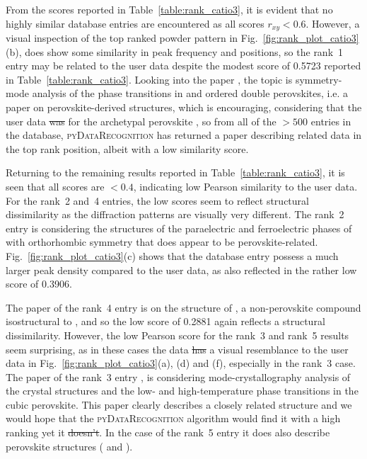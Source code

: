 \documentclass[preprint]{iucr}
\newcommand{\fig}[1]{Fig.~\ref{fig:#1}}
\newcommand{\tabl}[1]{Table~\ref{table:#1}}
\newcommand{\pydr}{\textsc{pyDataRecognition}\xspace}
\providecommand{\DIFadd}[1]{{\protect\color{blue}\uwave{#1}}} %
\providecommand{\DIFdel}[1]{{\protect\color{red}\sout{#1}}}                      %
\providecommand{\DIFaddbegin}{} %
\providecommand{\DIFaddend}{} %
\providecommand{\DIFdelbegin}{} %
\providecommand{\DIFdelend}{} %
\newcommand{\DIFscaledelfig}{0.5}
\newlength{\DIFdelgraphicswidth} %
\newlength{\DIFdelgraphicsheight} %
\newcommand{\DIFaddincludegraphics}[2][]{{\color{blue}\fbox{\DIFOincludegraphics[#1]{#2}}}} %
\newcommand{\DIFdelincludegraphics}[2][]{%
\sbox{\DIFdelgraphicsbox}{\DIFOincludegraphics[#1]{#2}}%
\settoboxwidth{\DIFdelgraphicswidth}{\DIFdelgraphicsbox} %
\settoboxtotalheight{\DIFdelgraphicsheight}{\DIFdelgraphicsbox} %
\scalebox{\DIFscaledelfig}{%
\parbox[b]{\DIFdelgraphicswidth}{\usebox{\DIFdelgraphicsbox}\\[-\baselineskip] \rule{\DIFdelgraphicswidth}{0em}}\llap{\resizebox{\DIFdelgraphicswidth}{\DIFdelgraphicsheight}{%
\setlength{\unitlength}{\DIFdelgraphicswidth}%
\begin{picture}(1,1)%
\thicklines\linethickness{2pt} %
{\color[rgb]{1,0,0}\put(0,0){\framebox(1,1){}}}%
{\color[rgb]{1,0,0}\put(0,0){\line( 1,1){1}}}%
{\color[rgb]{1,0,0}\put(0,1){\line(1,-1){1}}}%
\end{picture}%
}\hspace*{3pt}}} %
} %
\DeclareRobustCommand{\DIFaddbegin}{\DIFOaddbegin \let\includegraphics\DIFaddincludegraphics} %
\DeclareRobustCommand{\DIFaddend}{\DIFOaddend \let\includegraphics\DIFOincludegraphics} %
\DeclareRobustCommand{\DIFdelbegin}{\DIFOdelbegin \let\includegraphics\DIFdelincludegraphics} %
\DeclareRobustCommand{\DIFdelend}{\DIFOaddend \let\includegraphics\DIFOincludegraphics} %
\begin{document}
%
From the scores reported in \tabl{rank_catio3}, it is evident that no highly similar database entries are encountered as all scores $r_{xy}<0.6$.  However, a visual inspection of the top ranked powder pattern in \fig{rank_plot_catio3}(b), does show some similarity in peak frequency and positions, so the rank~1 entry may be related to the user data despite the modest score of 0.5723 reported in \tabl{rank_catio3}. Looking into the paper  \cite{iturbe-zabaloSymmetrymodeAnalysisPhase2013}, the topic is symmetry-mode analysis of the phase transitions in  and  ordered double perovskites, i.e. a paper on perovskite-derived structures, which is encouraging, considering that the user data \DIFdelbegin \DIFdel{was }\DIFdelend \DIFaddbegin \DIFadd{were }\DIFaddend for the archetypal perovskite , so from all of the $>500$ entries in the database, \pydr has returned a paper describing related data in the top rank position, albeit with a low similarity score. 

Returning to the remaining results reported in \tabl{rank_catio3}, it is seen that all scores are $<0.4$, indicating low Pearson similarity to the user data. For the rank~2 and~4 entries, the low scores seem to reflect structural dissimilarity as the diffraction patterns are visually very different. The rank~2 entry \cite{sciauStructuresPhasesParaelectrique1999} is considering the structures of the paraelectric and ferroelectric phases of  with orthorhombic symmetry that does appear to be perovskite-related. \fig{rank_plot_catio3}(c) shows that the database entry possess a much larger peak density compared to the user data, as also reflected in the rather low score of 0.3906.

The paper of the rank~4 entry \cite{kasunicStructureLaTi2Al9O19Reanalysis2011} is on the structure of , a non-perovskite compound isostructural to , and so the low score of 0.2881 again reflects a structural dissimilarity.
However, the low Pearson score for the rank~3 and rank~5 results seem surprising, as in these cases the data \DIFdelbegin \DIFdel{has }\DIFdelend \DIFaddbegin \DIFadd{have }\DIFaddend a  visual resemblance to the user data in \fig{rank_plot_catio3}(a), (d) and (f), especially in the rank~3 case. The paper of the rank~3 entry \cite{orayechModecrystallographyAnalysisCrystal2015}, is considering mode-crystallography analysis of the crystal structures and the low- and high-temperature phase transitions in the  cubic perovskite. This paper clearly describes a closely related structure and we would hope that the \pydr algorithm would find it with a high ranking yet it \DIFdelbegin \DIFdel{doesn't}\DIFdelend \DIFaddbegin \DIFadd{does not}\DIFaddend .  In the case of the rank~5 entry \cite{zhangStructuresK005Na02009} it does also describe perovskite structures ( and ).
\end{document}
